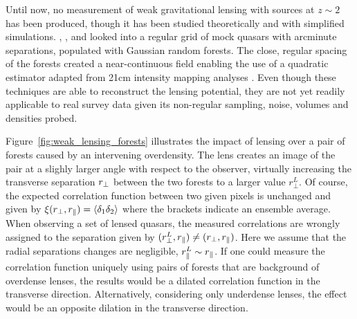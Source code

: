 Until now, no measurement of weak gravitational lensing with sources at 
$z\sim 2$ has been produced, though it has been studied theoretically and 
with simplified simulations. 
\cite{croftWeakLensingLyman2018}, 
\cite{metcalfNoiseEstimatesMeasurements2018}, and 
\cite{metcalfReconstructingGravitationalLensing2020a} looked into a regular grid 
of mock quasars with arcminute separations, populated with Gaussian random 
forests. The close, regular spacing of the forests created a near-continuous field
enabling the use of a quadratic estimator adapted from 21cm intensity mapping analyses
\cite{pourtsidouWeakLensing212014, pourtsidouGravitationalLensingCosmological2015}.
Even though these techniques are able to reconstruct the lensing potential, 
they are not yet readily applicable to real survey data given its non-regular
sampling, noise, volumes and densities probed. 


Figure~\ref{fig:weak_lensing_forests} illustrates the impact of lensing 
over a pair of \lya forests caused by an intervening overdensity. 
The lens creates an image of the pair at a slighly larger angle with 
respect to the observer, virtually increasing the transverse separation 
${r_\perp}$ between the two forests to a larger value $r_\perp^L$. Of course, 
the expected correlation function between two given pixels is unchanged 
and given by $\xi({r_\perp}, {r_\parallel}) = \langle \delta_1 \delta_2 \rangle$ 
where the brackets indicate an ensemble average. When observing a set 
of lensed quasars, the measured correlations are wrongly assigned to 
the separation given by $(r_\perp^L, {r_\parallel}) \neq ({r_\perp}, {r_\parallel})$. 
Here we assume that the radial separations changes are negligible, 
$r_\parallel^L \sim {r_\parallel}$. If one could measure the correlation function 
uniquely using pairs of forests that are background of overdense lenses, 
the results would be a dilated correlation function in the transverse 
direction. Alternatively, considering only underdense lenses, the effect 
would be an opposite dilation in the transverse direction. 



